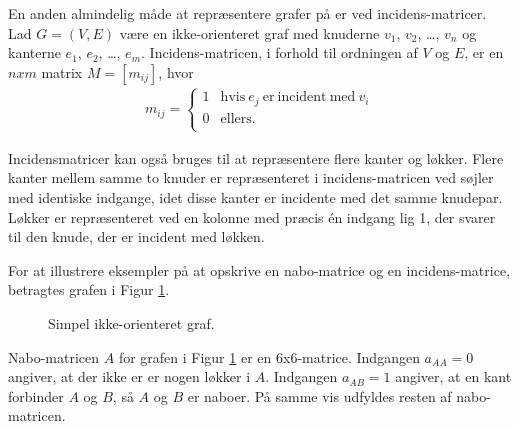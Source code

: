 \noindent En anden almindelig måde at repræsentere grafer på er ved incidens-matricer. Lad $G=(V,E)$ være en ikke-orienteret graf med knuderne $v_1$, $v_2$, \dots , $v_n$ og kanterne $e_1$, $e_2$, \dots , $e_m$. Incidens-matricen, i forhold til ordningen af $V$ og $E$, er en $n x m$ matrix $M=[m_{ij}]$, hvor 
\begin{align*}
m_{ij}= \left\{\begin{array}{cc}
1 & \textrm{hvis} \  {e_j} \  \textrm{er} \  \textrm{incident} \ \textrm{med} \ v_i \\
0 & \textrm{ellers}. \\
\end{array}\right.
\end{align*}

\noindent Incidensmatricer kan også bruges til at repræsentere flere kanter og løkker. Flere kanter mellem samme to knuder er repræsenteret i incidens-matricen ved søjler med identiske indgange, idet disse kanter er incidente med det samme knudepar. Løkker er repræsenteret ved en kolonne med præcis én indgang lig 1, der svarer til den knude, der er incident med løkken.

\begin{exmp}
For at illustrere eksempler på at opskrive en nabo-matrice og en incidens-matrice, betragtes grafen i Figur \ref{fig:f1}. 
\end{exmp} 

\begin{figure}[!h]
  \centering
  \caption{Simpel ikke-orienteret graf.}
  \label{fig:f1}
\end{figure}

\noindent Nabo-matricen $A$ for grafen i Figur \ref{fig:f1} er en $6$x$6$-matrice. Indgangen $a_{AA}=0$ angiver, at der ikke er er nogen løkker i $A$. Indgangen $a_{AB}=1$ angiver, at en kant forbinder $A$ og $B$, så $A$ og $B$ er naboer. På samme vis udfyldes resten af nabo-matricen. 

